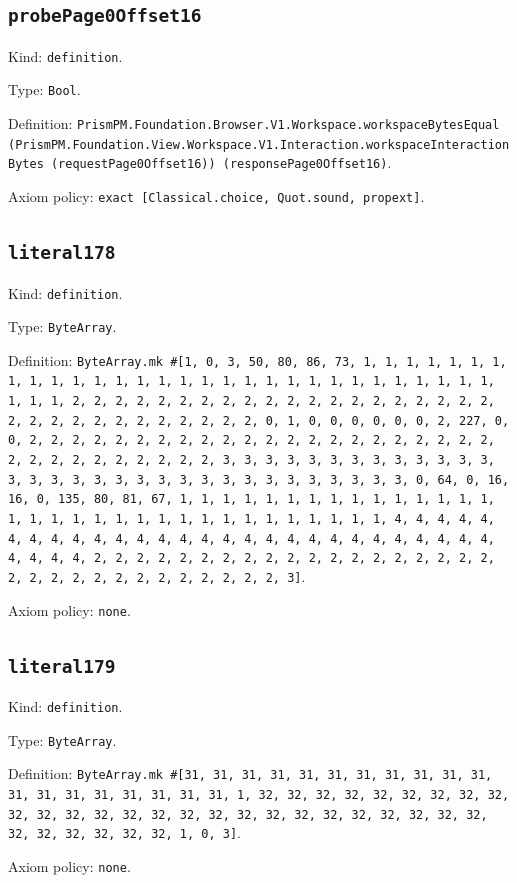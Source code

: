 \documentclass[11pt]{article}
\begin{document}
\subsection*{\texttt{probePage0Offset16}}
\noindent Kind: \texttt{definition}.\par
\noindent Type: \texttt{Bool}.\par
\noindent Definition: \texttt{PrismPM.Foundation.Browser.V1.Workspace.workspaceBytesEqual (PrismPM.Foundation.View.Workspace.V1.Interaction.workspaceInteractionBytes (requestPage0Offset16)) (responsePage0Offset16)}.\par
\noindent Axiom policy: \texttt{exact [Classical.choice, Quot.sound, propext]}.\par
\subsection*{\texttt{literal178}}
\noindent Kind: \texttt{definition}.\par
\noindent Type: \texttt{ByteArray}.\par
\noindent Definition: \texttt{ByteArray.mk \#[1, 0, 3, 50, 80, 86, 73, 1, 1, 1, 1, 1, 1, 1, 1, 1, 1, 1, 1, 1, 1, 1, 1, 1, 1, 1, 1, 1, 1, 1, 1, 1, 1, 1, 1, 1, 1, 1, 1, 1, 2, 2, 2, 2, 2, 2, 2, 2, 2, 2, 2, 2, 2, 2, 2, 2, 2, 2, 2, 2, 2, 2, 2, 2, 2, 2, 2, 2, 2, 2, 2, 2, 0, 1, 0, 0, 0, 0, 0, 0, 2, 227, 0, 0, 2, 2, 2, 2, 2, 2, 2, 2, 2, 2, 2, 2, 2, 2, 2, 2, 2, 2, 2, 2, 2, 2, 2, 2, 2, 2, 2, 2, 2, 2, 2, 2, 3, 3, 3, 3, 3, 3, 3, 3, 3, 3, 3, 3, 3, 3, 3, 3, 3, 3, 3, 3, 3, 3, 3, 3, 3, 3, 3, 3, 3, 3, 3, 3, 0, 64, 0, 16, 16, 0, 135, 80, 81, 67, 1, 1, 1, 1, 1, 1, 1, 1, 1, 1, 1, 1, 1, 1, 1, 1, 1, 1, 1, 1, 1, 1, 1, 1, 1, 1, 1, 1, 1, 1, 1, 1, 1, 4, 4, 4, 4, 4, 4, 4, 4, 4, 4, 4, 4, 4, 4, 4, 4, 4, 4, 4, 4, 4, 4, 4, 4, 4, 4, 4, 4, 4, 4, 4, 4, 2, 2, 2, 2, 2, 2, 2, 2, 2, 2, 2, 2, 2, 2, 2, 2, 2, 2, 2, 2, 2, 2, 2, 2, 2, 2, 2, 2, 2, 2, 2, 2, 3]}.\par
\noindent Axiom policy: \texttt{none}.\par
\subsection*{\texttt{literal179}}
\noindent Kind: \texttt{definition}.\par
\noindent Type: \texttt{ByteArray}.\par
\noindent Definition: \texttt{ByteArray.mk \#[31, 31, 31, 31, 31, 31, 31, 31, 31, 31, 31, 31, 31, 31, 31, 31, 31, 31, 31, 1, 32, 32, 32, 32, 32, 32, 32, 32, 32, 32, 32, 32, 32, 32, 32, 32, 32, 32, 32, 32, 32, 32, 32, 32, 32, 32, 32, 32, 32, 32, 32, 32, 1, 0, 3]}.\par
\noindent Axiom policy: \texttt{none}.\par
\end{document}
